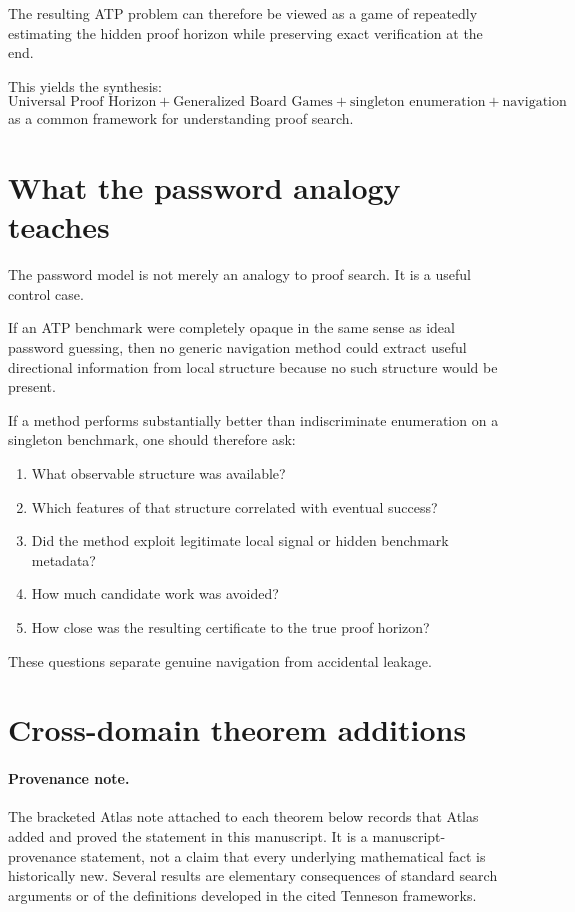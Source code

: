 \documentclass[11pt]{article}
\begin{document}
The resulting ATP problem can therefore be viewed as a game of repeatedly
estimating the hidden proof horizon while preserving exact verification at the
end.

This yields the synthesis:
\[
\boxed{
\text{Universal Proof Horizon}
+
\text{Generalized Board Games}
+
\text{singleton enumeration}
+
\text{navigation}
}
\]
as a common framework for understanding proof search.

\section{What the password analogy teaches}

The password model is not merely an analogy to proof search. It is a useful
control case.

If an ATP benchmark were completely opaque in the same sense as ideal password
guessing, then no generic navigation method could extract useful directional
information from local structure because no such structure would be present.

If a method performs substantially better than indiscriminate enumeration on a
singleton benchmark, one should therefore ask:

\begin{enumerate}[leftmargin=2em]
    \item What observable structure was available?
    \item Which features of that structure correlated with eventual success?
    \item Did the method exploit legitimate local signal or hidden benchmark
    metadata?
    \item How much candidate work was avoided?
    \item How close was the resulting certificate to the true proof horizon?
\end{enumerate}

These questions separate genuine navigation from accidental leakage.


\section{Cross-domain theorem additions}

\paragraph{Provenance note.}
The bracketed Atlas note attached to each theorem below records that Atlas added
and proved the statement in this manuscript.  It is a manuscript-provenance
statement, not a claim that every underlying mathematical fact is historically
new.  Several results are elementary consequences of standard search arguments
or of the definitions developed in the cited Tenneson frameworks.
\end{document}
